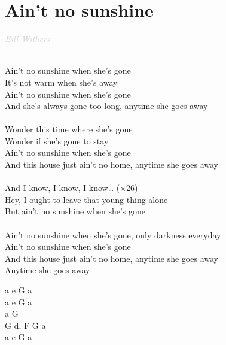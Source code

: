 \documentclass[a5paper, 10pt]{book}
\begin{document}
\section{Ain't no sunshine}\textcolor{lightgray}{\textit{Bill Withers}}\\~\\
\begin{minipage}[t]{0.8\textwidth}
Ain't no sunshine when she's gone\\
It's not warm when she's away\\
Ain't no sunshine when she's gone\\
And she's always gone too long, anytime she goes away\\
\\
Wonder this time where she's gone\\
Wonder if she's gone to stay\\
Ain't no sunshine when she's gone\\
And this house just ain't no home, anytime she goes away\\
\\
\hspace*{5mm}And I know, I know, I know… ($\times$26)\\
\hspace*{5mm}Hey, I ought to leave that young thing alone\\
\hspace*{5mm}But ain't no sunshine when she's gone\\
\\
Ain't no sunshine when she's gone, only darkness everyday\\
Ain't no sunshine when she's gone\\
And this house just ain't no home, anytime she goes away\\
Anytime she goes away
\end{minipage}
\begin{minipage}[t]{0.2\textwidth}
a e G  a\\
a e G  a\\
a G  \\
G d, F G a\\
a e G  a\\

\end{minipage}

\end{document}
